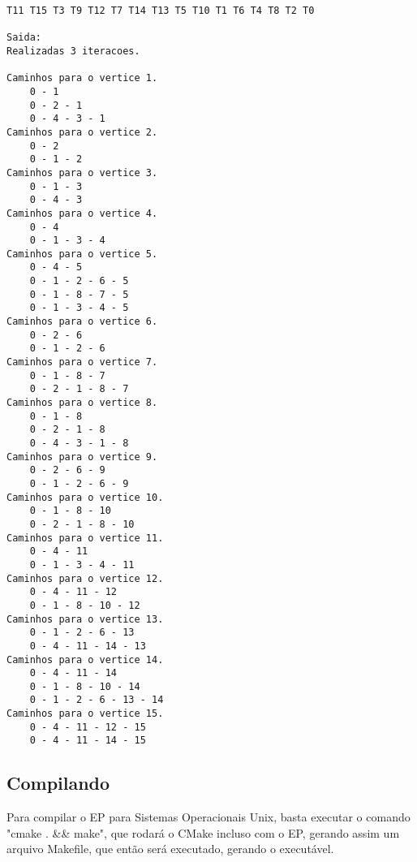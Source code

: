 \documentclass[11pt]{article} %
\begin{document}
\begin{lstlisting}[breaklines]
T11 T15 T3 T9 T12 T7 T14 T13 T5 T10 T1 T6 T4 T8 T2 T0 

Saida:
Realizadas 3 iteracoes.

Caminhos para o vertice 1.
	0 - 1
	0 - 2 - 1
	0 - 4 - 3 - 1
Caminhos para o vertice 2.
	0 - 2
	0 - 1 - 2
Caminhos para o vertice 3.
	0 - 1 - 3
	0 - 4 - 3
Caminhos para o vertice 4.
	0 - 4
	0 - 1 - 3 - 4
Caminhos para o vertice 5.
	0 - 4 - 5
	0 - 1 - 2 - 6 - 5
	0 - 1 - 8 - 7 - 5
	0 - 1 - 3 - 4 - 5
Caminhos para o vertice 6.
	0 - 2 - 6
	0 - 1 - 2 - 6
Caminhos para o vertice 7.
	0 - 1 - 8 - 7
	0 - 2 - 1 - 8 - 7
Caminhos para o vertice 8.
	0 - 1 - 8
	0 - 2 - 1 - 8
	0 - 4 - 3 - 1 - 8
Caminhos para o vertice 9.
	0 - 2 - 6 - 9
	0 - 1 - 2 - 6 - 9
Caminhos para o vertice 10.
	0 - 1 - 8 - 10
	0 - 2 - 1 - 8 - 10
Caminhos para o vertice 11.
	0 - 4 - 11
	0 - 1 - 3 - 4 - 11
Caminhos para o vertice 12.
	0 - 4 - 11 - 12
	0 - 1 - 8 - 10 - 12
Caminhos para o vertice 13.
	0 - 1 - 2 - 6 - 13
	0 - 4 - 11 - 14 - 13
Caminhos para o vertice 14.
	0 - 4 - 11 - 14
	0 - 1 - 8 - 10 - 14
	0 - 1 - 2 - 6 - 13 - 14
Caminhos para o vertice 15.
	0 - 4 - 11 - 12 - 15
	0 - 4 - 11 - 14 - 15
\end{lstlisting}

\subsection{Compilando}
Para compilar o EP para Sistemas Operacionais Unix, basta executar o comando "cmake . \&\&  make", que rodará o CMake incluso com o EP, gerando assim um arquivo Makefile, que então será executado, gerando o executável.
\end{document}
